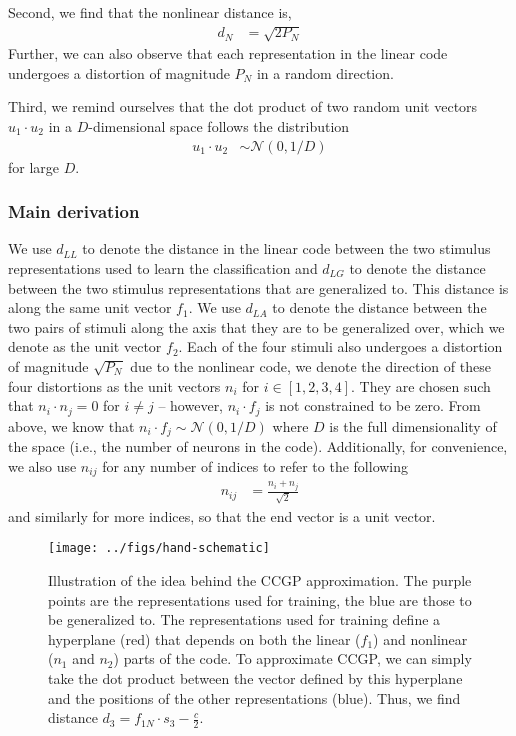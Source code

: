 \documentclass[letter,12pt]{article}
\newcommand{\dll}{d_{LL}}
\newcommand{\dlg}{d_{LG}}
\newcommand{\dla}{d_{LA}}
\newcommand{\dis}{\mathcal{N}(0, 1/D)}
\begin{document}
Second, we find that the nonlinear distance is,
\begin{align}
  d_{N} &= \sqrt{2 P_{N}}
\end{align}
Further, we can also observe that each representation in the linear code
undergoes a distortion of magnitude $P_{N}$ in a random direction.

Third, we remind ourselves that the dot product of two random unit vectors
$u_{1} \cdot u_{2}$ in a $D$-dimensional space follows the distribution
\begin{align}
  u_{1} \cdot u_{2} &\sim \dis
\end{align}
for large $D$.

\subsubsection{Main derivation}
We use $\dll$ to denote the distance in the linear code between the two
stimulus representations used to learn the classification and $\dlg$ to
denote the distance between the two stimulus representations that are generalized
to. This distance is along the same unit vector $f_{1}$. We use $\dla$ to
denote the distance between the two pairs of stimuli along the axis that they are
to be generalized over, which we denote as the unit vector $f_{2}$. Each of the
four stimuli also undergoes a distortion of magnitude $\sqrt{P_{N}}$ due to the
nonlinear code, we denote the direction of these four distortions as the unit
vectors $n_{i}$ for $i \in [1, 2, 3, 4]$. They are chosen such that
$n_{i} \cdot n_{j} = 0$ for $i \ne j$ -- however, $n_{i} \cdot f_{j}$ is not
constrained to be zero. From above, we know that
$n_{i} \cdot f_{j} \sim \dis$ where $D$ is the
full dimensionality of the space (i.e., the number of neurons in the code).
Additionally, for convenience, we also use $n_{ij}$ for any number of indices
to refer to the following
\begin{align}
  n_{ij} &= \frac{n_{i} + n_{j}}{\sqrt{2}}
\end{align}
and similarly for more indices, so that the end vector is a unit vector.

\begin{figure}[ht!]
  \begin{center}
    \texttt{[image: ../figs/hand-schematic]}
  \end{center}
  \caption[Illustration of the idea behind the CCGP approximation.]
          {Illustration of the idea behind the CCGP approximation.
            The purple points are the representations used for training, the
            blue are those to be generalized to. The representations used
            for training define a hyperplane (red) that depends on both the
            linear ($f_{1}$) and nonlinear ($n_{1}$ and $n_{2}$) parts of
            the code. To approximate CCGP, we can simply take the dot product
            between the vector defined by this hyperplane and the positions of
            the other representations (blue). Thus, we find distance
            $d_{3} = f_{1N} \cdot s_{3} - \frac{c}{2}$. 
  }
  \label{schem}
\end{figure}
\end{document}
